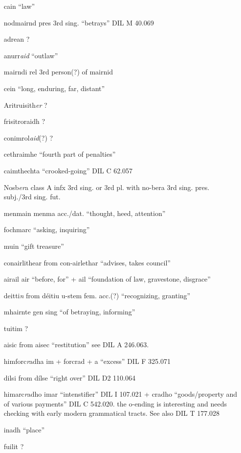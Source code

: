 \documentclass[11pt]{article}
\begin{document}
\begin{enumerate}
  \item[cain] \enquote{law}
  \item[nodmairnd] pres 3rd sing. \enquote{betrays} DIL M 40.069
  \item[adrean] ?
  \item[anurr\emph{aid}] \enquote{outlaw}
  \item[mairndi] rel 3rd person(?) of mairnid
  \item[cein] \enquote{long, enduring, far, distant} 
  \item[Aritruisith\emph{er}] ?
  \item[frisitroraidh] ? 
  \item[conimrol\emph{aid}(?)] ?
  \item[cethraimhe] \enquote{fourth part of penalties}
  \item[caimthechta] \enquote{crooked-going} DIL C 62.057
  \item[Nosb\emph{er}a] class A infx 3rd sing. or 3rd pl. with no-bera 3rd sing. pres. subj./3rd sing. fut.
  \item[menmain] menma acc./dat. \enquote{thought, heed, attention}
  \item[fochmarc] \enquote{asking, inquiring}
  \item[muin] \enquote{gift treasure}
  \item[conairlithear] from con-airlethar \enquote{advises, takes council}
  \item[airail] air \enquote{before, for} + ail \enquote{foundation of law, gravestone, disgrace}
  \item[deitti\emph{n}] from d\'{e}itiu u-stem fem. acc.(?) \enquote{recognizing, granting}
  \item[mhairnte] gen sing \enquote{of betraying, informing}
  \item[tuitim] ?
  \item[aisic] from aisec \enquote{restitution} see DIL A 246.063.
  \item[himforc\emph{r}adha] im + forcrad + a \enquote{excess} DIL F 325.071
  \item[dilsi] from d\'{i}lse \enquote{right over} DIL D2 110.064
  \item[himarc\emph{r}adho] imar \enquote{intenstifier} DIL I 107.021 + cradho \enquote{goods/property and of various payments} DIL C 542.020. the o-ending is interesting and needs checking with early modern grammatical tracts.  See also DIL T 177.028
  \item[inadh] \enquote{place}
  \item[fuilit] ?

\end{enumerate}
\end{document}
